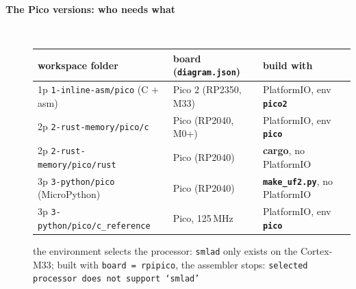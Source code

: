 \begin{description}
\item[{\rot\bf The Pico versions: who needs what}]~\\[-\lblskip]
\begin{center}
{\small%
\begin{tabularx}{\linewidth}{|L|>{\raggedright}p{46mm}|>{\raggedright\arraybackslash}p{50mm}|}
\hline
\textbf{workspace folder} & \textbf{board (\texttt{diagram.json})} & \textbf{build with} \\
\hline
1p \texttt{1-inline-asm/pico} (C + asm) & Pico 2 (RP2350, M33) & PlatformIO, env \textbf{\texttt{pico2}} \\
2p \texttt{2-rust-memory/pico/c} & Pico (RP2040, M0+) & PlatformIO, env \textbf{\texttt{pico}} \\
2p \texttt{2-rust-memory/pico/rust} & Pico (RP2040) & \textbf{cargo}, no PlatformIO \\
3p \texttt{3-python/pico} (MicroPython) & Pico (RP2040) & \textbf{\texttt{make\_uf2.py}}, no PlatformIO \\
3p \texttt{3-python/pico/c\_reference} & Pico, 125\,MHz & PlatformIO, env \textbf{\texttt{pico}} \\
\hline
\end{tabularx}}
\end{center}
\begin{center}
\end{center}
\bi
	\ite the environment selects the processor: \texttt{smlad} only exists on the Cortex-M33; built with \texttt{board = rpipico}, the assembler stops: \texttt{selected processor does not support `smlad'}
\ei
\os{\newpage}


\end{description}
